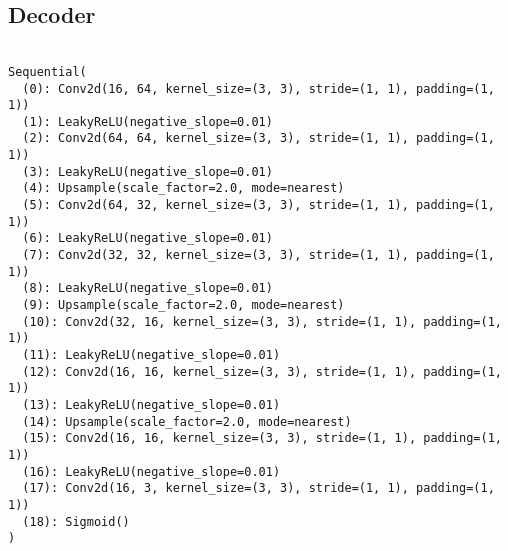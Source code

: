 \documentclass[11pt]{article} %
\begin{document}
\clearpage
\subsection{Decoder}

\begin{verbatim}

Sequential(
  (0): Conv2d(16, 64, kernel_size=(3, 3), stride=(1, 1), padding=(1, 1))
  (1): LeakyReLU(negative_slope=0.01)
  (2): Conv2d(64, 64, kernel_size=(3, 3), stride=(1, 1), padding=(1, 1))
  (3): LeakyReLU(negative_slope=0.01)
  (4): Upsample(scale_factor=2.0, mode=nearest)
  (5): Conv2d(64, 32, kernel_size=(3, 3), stride=(1, 1), padding=(1, 1))
  (6): LeakyReLU(negative_slope=0.01)
  (7): Conv2d(32, 32, kernel_size=(3, 3), stride=(1, 1), padding=(1, 1))
  (8): LeakyReLU(negative_slope=0.01)
  (9): Upsample(scale_factor=2.0, mode=nearest)
  (10): Conv2d(32, 16, kernel_size=(3, 3), stride=(1, 1), padding=(1, 1))
  (11): LeakyReLU(negative_slope=0.01)
  (12): Conv2d(16, 16, kernel_size=(3, 3), stride=(1, 1), padding=(1, 1))
  (13): LeakyReLU(negative_slope=0.01)
  (14): Upsample(scale_factor=2.0, mode=nearest)
  (15): Conv2d(16, 16, kernel_size=(3, 3), stride=(1, 1), padding=(1, 1))
  (16): LeakyReLU(negative_slope=0.01)
  (17): Conv2d(16, 3, kernel_size=(3, 3), stride=(1, 1), padding=(1, 1))
  (18): Sigmoid()
)

\end{verbatim}

\printbibliography
\end{document}
